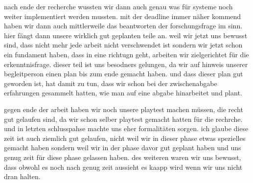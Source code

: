 \documentclass[../Main.tex]{subfiles}
\begin{document}
nach ende der recherche wussten wir dann auch genau was für systeme noch weiter implementiert werden mussten. mit der deadline immer näher kommend haben wir dann auch mittlerweile das beantworten der forschungsfrage im sinn. hier fängt dann unsere wirklich gut geplanten teile an. weil wir jetzt uns bewusst sind, dass nicht mehr jede arbeit nicht verschwendet ist sondern wir jetzt schon ein fundament haben, dass in eine richtugn geht, arbeiten wir zielgerichtet für die erkenntnisfrage. dieser teil ist uns besodners gelungen, da wir auf hinweis unserer begleitperson einen plan bis zum ende gemacht haben. und dass dieser plan gut geworden ist, hat damit zu tun, dass wir schon bei der zwischenabgabe erfahrungen gesammelt hatten, wie man auf eine abgabe hinarbeitet und plant.

gegen ende der arbeit haben wir noch unsere playtest machen müssen, die recht gut gelaufen sind, da wir schon selber playtest gemacht hatten für die rechrche. und in letzten schlusspahse machte uns eher formalitäten sorgen. ich glaube diese zeit ist auch ziemlich gut gelaufen, nicht weil wir in dieser phase etwas spezielles gemacht haben sondern weil wir in der phase davor gut geplant haben und uns genug zeit für diese phase gelassen haben. des weiteren waren wir uns bewusst, dass obwohl es noch nach genug zeit aussieht es kaapp wird wenn wir uns nicht dran halten.
\end{document}
